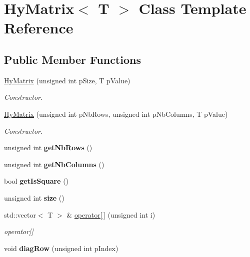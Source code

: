 \hypertarget{classHyMatrix}{
\section{HyMatrix$<$ T $>$ Class Template Reference}
\label{classHyMatrix}
}
\subsection*{Public Member Functions}
\begin{DoxyCompactItemize}
\item 
\hyperlink{classHyMatrix_a7e6eff97c9a87088513c587b73eafde0}{HyMatrix} (unsigned int pSize, T pValue)
\begin{DoxyCompactList}\small\item\em Constructor. \item\end{DoxyCompactList}\item 
\hyperlink{classHyMatrix_a43816079e02155aedf11c1101bd35bc4}{HyMatrix} (unsigned int pNbRows, unsigned int pNbColumns, T pValue)
\begin{DoxyCompactList}\small\item\em Constructor. \item\end{DoxyCompactList}\item 
\hypertarget{classHyMatrix_adc9b600eb1ab49aaea1fb3efa7b6e64f}{
unsigned int {\bfseries getNbRows} ()}
\label{classHyMatrix_adc9b600eb1ab49aaea1fb3efa7b6e64f}

\item 
\hypertarget{classHyMatrix_a50f812738c3e6017214fb66fb29ceceb}{
unsigned int {\bfseries getNbColumns} ()}
\label{classHyMatrix_a50f812738c3e6017214fb66fb29ceceb}

\item 
\hypertarget{classHyMatrix_a5af484dcfa5ff7faef24f177f46e94b4}{
bool {\bfseries getIsSquare} ()}
\label{classHyMatrix_a5af484dcfa5ff7faef24f177f46e94b4}

\item 
\hypertarget{classHyMatrix_a045e0b320e3e45d1ca3257704a040290}{
unsigned int {\bfseries size} ()}
\label{classHyMatrix_a045e0b320e3e45d1ca3257704a040290}

\item 
std::vector$<$ T $>$ \& \hyperlink{classHyMatrix_ae6752e1b495cc71c41c68632afe0761c}{operator\mbox{[}$\,$\mbox{]}} (unsigned int i)
\begin{DoxyCompactList}\small\item\em operator\mbox{[}\mbox{]} \item\end{DoxyCompactList}\item 
\hypertarget{classHyMatrix_ae0cfb3b19ebb77f9f41a4d4b890b3b39}{
void {\bfseries diagRow} (unsigned int pIndex)}
\label{classHyMatrix_ae0cfb3b19ebb77f9f41a4d4b890b3b39}


\end{DoxyCompactItemize}
